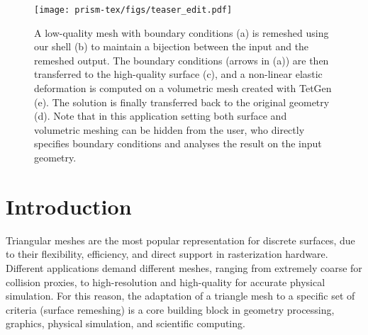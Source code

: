 
\begin{figure}
	\centering
	\texttt{[image: prism-tex/figs/teaser\_edit.pdf]}
    \caption{A low-quality mesh with boundary conditions (a)
    is remeshed using our shell (b)
    to maintain a bijection between the input and the remeshed output.
    The boundary conditions (arrows in (a)) are then transferred to the high-quality surface (c),
    and a non-linear elastic deformation is computed %
    on a volumetric mesh created with TetGen ({e}).
    The solution is finally transferred back to the original geometry ({d}).
    Note that in this application setting both surface and volumetric meshing {can be hidden from} the user, {who} directly specifies boundary conditions and analyses the result on the input geometry.}
    
    \label{prism:fig:teaser}
\end{figure}

\section{Introduction}
\label{prism:sec:introduction}

Triangular meshes are the most popular representation for discrete surfaces, due to their flexibility, efficiency, and direct support in rasterization hardware. Different applications demand different meshes, ranging from extremely coarse for collision proxies, to high-resolution and high-quality for accurate physical simulation.
%
For this reason, the adaptation of a triangle mesh to a specific set of criteria (surface remeshing) is a core building block in geometry processing, graphics, physical simulation, and scientific computing.

